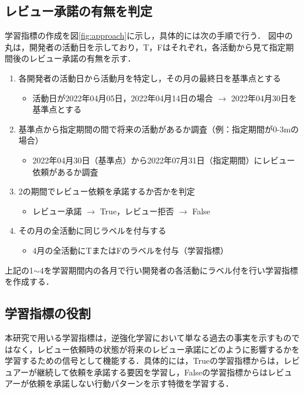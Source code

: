 \documentclass[11pt]{jreport}
\begin{document}
\subsection{レビュー承諾の有無を判定}
学習指標の作成を図\ref{fig:approach}に示し，具体的には次の手順で行う．
図中の丸は，開発者の活動日を示しており，T，Fはそれぞれ，各活動から見て指定期間後のレビュー承諾の有無を示す．

\begin{enumerate}
    \item 各開発者の活動日から活動月を特定し，その月の最終日を基準点とする
    \begin{itemize}
        \item 活動日が2022年04月05日，2022年04月14日の場合 $\rightarrow$ 2022年04月30日を基準点とする
    \end{itemize}
    \item 基準点から指定期間の間で将来の活動があるか調査（例：指定期間が0-3mの場合）
    \begin{itemize}
        \item 2022年04月30日（基準点）から2022年07月31日（指定期間）にレビュー依頼があるか調査
    \end{itemize}
    \item 2の期間でレビュー依頼を承諾するか否かを判定
    \begin{itemize}
        \item レビュー承諾 $\rightarrow$ True，レビュー拒否 $\rightarrow$ False
    \end{itemize}
        \item その月の全活動に同じラベルを付与する
    \begin{itemize}
        \item 4月の全活動にTまたはFのラベルを付与（学習指標）
    \end{itemize}
\end{enumerate}
上記の1$\sim$4を学習期間内の各月で行い開発者の各活動にラベル付を行い学習指標を作成する．

\subsection{学習指標の役割}
本研究で用いる学習指標は，逆強化学習において単なる過去の事実を示すものではなく，レビュー依頼時の状態が将来のレビュー承諾にどのように影響するかを学習するための信号として機能する．具体的には，Trueの学習指標からは，レビュアーが継続して依頼を承諾する要因を学習し，Falseの学習指標からはレビュアーが依頼を承諾しない行動パターンを示す特徴を学習する．
\end{document}
